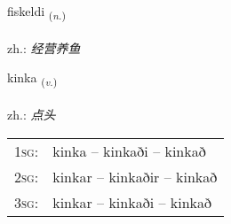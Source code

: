 \documentclass[frontgrid, backgrid]{flacards}\usepackage[]{graphicx}\usepackage[]{xcolor}
\begin{document}
\renewcommand{\flhead}{\vskip5pt \fboxsep=0pt {\small\bfseries\footnotesize Nafnorð | 名词}}
\renewcommand{\fcfoot}{\vskip5pt \fboxsep=0pt \hspace{2pt}{\small\bfseries\footnotesize 3K}}

\renewcommand{\blhead}{\vskip5pt {\small\bfseries\footnotesize Nafnorð | 名词 }}
\renewcommand{\bcfoot}{\vskip5pt \hspace{2pt}{\small\bfseries\footnotesize 3K}}


{fiskeldi \small{\textsubscript{(\textit{n.})}} \\[1ex] %
\textphonetic{[fɪskɛltɪ]} \\
zh.: \emph{经营养鱼} \\  [2ex]
\renewcommand*{\arraystretch}{0.8}
}

\renewcommand{\flhead}{\vskip5pt \fboxsep=0pt {\small\bfseries\footnotesize Sagnorð | 动词}}
\renewcommand{\fcfoot}{\vskip5pt \fboxsep=0pt \hspace{2pt}{\small\bfseries\footnotesize 3K}}

\renewcommand{\blhead}{\vskip5pt {\small\bfseries\footnotesize Sagnorð | 动词 }}
\renewcommand{\bcfoot}{\vskip5pt \hspace{2pt}{\small\bfseries\footnotesize 3K}}


{kinka \small{\textsubscript{(\textit{v.})}} \\[1ex] %
\textphonetic{[cʰiŋ̥ka]} \\
zh.: \emph{点头} \\  [2ex]
\renewcommand*{\arraystretch}{0.8}
\begin{tabular}{p{1cm}l}
\textsc{1sg}: & kinka -- kinkaði -- kinkað \\ 
\textsc{2sg}: & kinkar -- kinkaðir -- kinkað \\ 
\textsc{3sg}: & kinkar -- kinkaði -- kinkað \\ 
\end{tabular}
}
\end{document}
